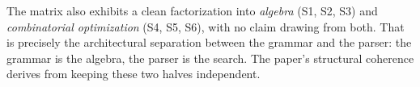 The matrix also exhibits a clean factorization
into \emph{algebra} (S1, S2, S3) and
\emph{combinatorial optimization} (S4, S5, S6),
with no claim drawing from both. That is precisely
the architectural separation between the grammar
and the parser: the grammar is the algebra, the
parser is the search. The paper's structural
coherence derives from keeping these two
halves independent.
